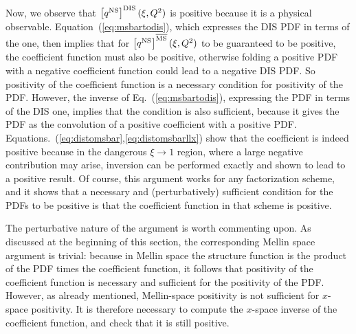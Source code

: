 Now, we observe that
$\left[{q^{{\textrm{NS}}}}\right]^{\textrm{DIS}}(\xi,Q^2)$ is positive because it is a physical
observable. Equation~(\ref{eq:msbartodis}), which expresses the DIS
PDF in terms of the \msbar{} one, then  implies that  for
$\left[{q^{{\textrm{NS}}}}\right]^{{\overline{\textrm{{MS}}}}}(\xi,Q^2)$  to be guaranteed to be
positive,
the \msbar{} coefficient function  must also be positive, otherwise
folding a positive \msbar{}  PDF with a negative coefficient function
could lead to a negative DIS PDF. So positivity of the \msbar{}
coefficient function
is a necessary condition for positivity of the \msbar{} PDF.
However, the inverse of  Eq.~(\ref{eq:msbartodis}), expressing the
\msbar{} PDF in terms of the DIS one, implies that the condition is
also sufficient, because it gives the \msbar{} PDF as the convolution
of a positive coefficient with a positive PDF. Equations.~(\ref{eq:distomsbar},\ref{eq:distomsbarllx}) show that the coefficient is indeed
positive because in the dangerous
$\xi\to 1$ region, where  a large negative contribution may arise,
inversion can be performed exactly and shown to lead to a positive
result.
Of
course, this argument works for any factorization scheme, and it shows
that a necessary and (perturbatively) sufficient condition for the
PDFs to be positive is that the coefficient function in that scheme is positive.

The perturbative nature of the argument is worth commenting
upon. As discussed at the beginning of this section, the corresponding
Mellin space argument is trivial: because in Mellin space the
structure function is the product of the PDF times the coefficient
function, it follows that positivity of the coefficient function is
necessary and sufficient for the positivity of the PDF. However, as
already mentioned,
Mellin-space positivity is not sufficient for $x$-space positivity. It
is therefore necessary to compute the $x$-space inverse of the
coefficient function, and check that it is still positive.

